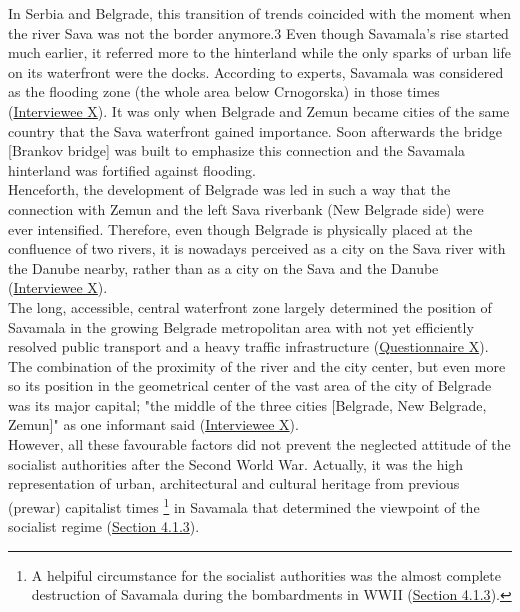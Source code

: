 \documentclass[11pt]{report}
\begin{document}
In Serbia and Belgrade, this transition of trends coincided with the moment when the river Sava was not the border anymore.3 Even though Savamala’s rise started much earlier, it referred more to the hinterland while the only sparks of urban life on its waterfront were the docks. According to experts, Savamala was considered as the flooding zone (the whole area below Crnogorska) in those times (\href{InterviewX}{Interviewee X}).
It was only when Belgrade and Zemun became cities of the same country that the Sava waterfront gained importance. Soon afterwards the bridge [Brankov bridge] was built to emphasize this connection and the Savamala hinterland was fortified against flooding.
\\

Henceforth, the development of Belgrade was led in such a way that the connection with Zemun and the left Sava riverbank (New Belgrade side) were ever intensified. Therefore, even though Belgrade is physically placed at the confluence of two rivers, it is nowadays perceived as a city on the Sava river with the Danube nearby, rather than as a city on the Sava and the Danube (\href{InterviewX}{Interviewee X}).
\\

The long, accessible, central waterfront zone largely determined the position of Savamala in the growing Belgrade metropolitan area with not yet efficiently resolved public transport and a heavy traffic infrastructure  (\href{Questionnaire Experts Savamala}{Questionnaire X}).
The combination of the proximity of the river and the city center, but even more so its position in the geometrical center of the vast area of the city of Belgrade was its major capital; "the middle of the three cities [Belgrade, New Belgrade, Zemun]" as one informant said (\href{InterviewX}{Interviewee X}).
\\

However, all these favourable factors did not prevent the neglected attitude of the socialist authorities after the Second World War.
Actually, it was the high representation of urban, architectural and cultural heritage from previous (prewar) capitalist times
\footnote{A helpiful circumstance for the socialist authorities was the almost complete destruction of Savamala during the bombardments in WWII  (\href{Section 4.1.3}{Section 4.1.3}).}
in Savamala that determined the viewpoint of the socialist regime (\href{Section 4.1.3}{Section 4.1.3}).
\\
\end{document}

